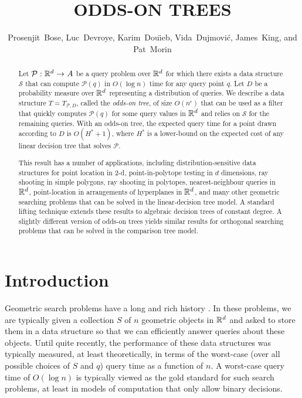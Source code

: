 \documentclass{patmorin}
\title{\MakeUppercase{Odds-On Trees}}
\author{Prosenjit~Bose, 
        Luc~Devroye,
	Karim~Dou\"{\i}eb, 
	Vida~Dujmovi\'c, 
	James~King, and 
	Pat~Morin}
\newcommand{\eps}{\epsilon}
\begin{document}
\maketitle

\begin{abstract}
  Let $\mathcal{P}:\mathbb{R}^d\rightarrow A$ be a query problem over $\mathbb{R}^d$
  for which there exists a data structure $\mathcal{S}$ that can compute
  $\mathcal{P}(q)$ in $O(\log n)$ time for any query point $q$.  Let $D$
  be a probability measure over $\mathbb{R}^d$ representing a distribution of
  queries.  We describe a data structure $T=T_{\mathcal{P},D}$, called
  the \emph{odds-on tree}, of size $O(n^\eps)$ that can be used as a
  filter that quickly computes $\mathcal{P}(q)$ for some query values in
  $\mathbb{R}^d$ and relies on $\mathcal{S}$ for the remaining queries.  With an
  odds-on tree, the expected query time for a point drawn according to
  $D$ is $O(H^*+1)$, where $H^*$ is a lower-bound on the expected cost
  of any linear decision tree that solves $\mathcal{P}$.

  This result has a number of applications, including
  distribution-sensitive data structures for point location in 2-d,
  point-in-polytope testing in $d$ dimensions, ray shooting in simple
  polygons, ray shooting in polytopes, nearest-neighbour queries in
  $\mathbb{R}^d$, point-location in arrangements of hyperplanes in $\mathbb{R}^d$,
  and many other geometric searching problems that can be solved in the
  linear-decision tree model.  A standard lifting technique extends these
  results to algebraic decision trees of constant degree.  A slightly
  different version of odds-on trees yields similar results for orthogonal
  searching problems that can be solved in the comparison tree model.
\end{abstract}

\section{Introduction}

Geometric search problems have a long and rich history
\cite{ae99,g00chapter,ms05}. In these problems, we are typically
given a collection $S$ of $n$ geometric objects in $\mathbb{R}^d$ and asked
to store them in a data structure so that we can efficiently answer
queries about these objects. Until quite recently, the performance of
these data structures was typically measured, at least theoretically,
in terms of the worst-case (over all possible choices of $S$ and $q$)
query time as a function of $n$.  A worst-case query time of $O(\log
n)$ is typically viewed as the gold standard for such search problems,
at least in models of computation that only allow binary decisions.
\end{document}
